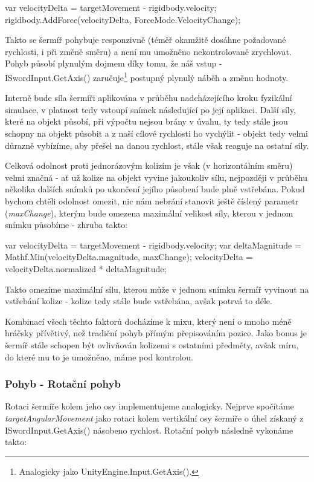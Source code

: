 \begin{code}
 var velocityDelta = targetMovement - rigidbody.velocity;
 rigidbody.AddForce(velocityDelta, ForceMode.VelocityChange);
\end{code}


Takto se šermíř pohybuje responzivně (téměř okamžitě dosáhne požadované rychlosti, i při změně směru) a není mu umožněno nekontrolovaně zrychlovat. Pohyb působí plynulým dojmem díky tomu, že náš vstup - ISwordInput.GetAxis() zaručuje\footnote{Analogicky jako UnityEngine.Input.GetAxis().} postupný plynulý náběh a změnu hodnoty.

Interně bude síla šermíři aplikována v průběhu nadcházejícího kroku fyzikální simulace, v platnost tedy vstoupí snímek následující po její aplikaci. Další síly, které na objekt působí, při výpočtu nejsou brány v úvahu, ty tedy stále jsou schopny na objekt působit a z naší cílové rychlosti ho vychýlit - objekt tedy velmi důrazně vybízíme, aby přešel na danou rychlost, stále však reaguje na ostatní síly. 

Celková odolnost proti jednorázovým kolizím je však (v horizontálním směru) velmi značná - ať už kolize na objekt vyvine jakoukoliv sílu, nejpozději v průběhu několika dalších snímků po ukončení jejího působení bude plně vstřebána. Pokud bychom chtěli odolnost omezit, nic nám nebrání stanovit ještě číslený parametr (\textit{maxChange}), kterým bude omezena maximální velikost síly, kterou v jednom snímku působíme - zhruba takto:

\begin{code}
 var velocityDelta = targetMovement - rigidbody.velocity;
 var deltaMagnitude = Mathf.Min(velocityDelta.magnitude, maxChange);
 velocityDelta = velocityDelta.normalized * deltaMagnitude;
\end{code}

Takto omezíme maximální sílu, kterou může v jednom snímku šermíř vyvinout na vstřebání kolize - kolize tedy stále bude vstřebána, avšak potrvá to déle.

Kombinací všech těchto faktorů docházíme k mixu, který není o mnoho méně hráčsky přívětivý, než tradiční pohyb přímým přepisováním pozice. Jako bonus je šermíř stále schopen být ovlivňován kolizemi s ostatními předměty, avšak míru, do které mu to je umožněno, máme pod kontrolou.

\subsubsection*{Pohyb - Rotační pohyb}
Rotaci šermíře kolem jeho osy implementujeme analogicky. Nejprve spočítáme \textit{targetAngularMovement} jako rotaci kolem vertikální osy šermíře o úhel získaný z ISwordInput.GetAxis() násobeno rychlost. Rotační pohyb následně vykonáme takto:

